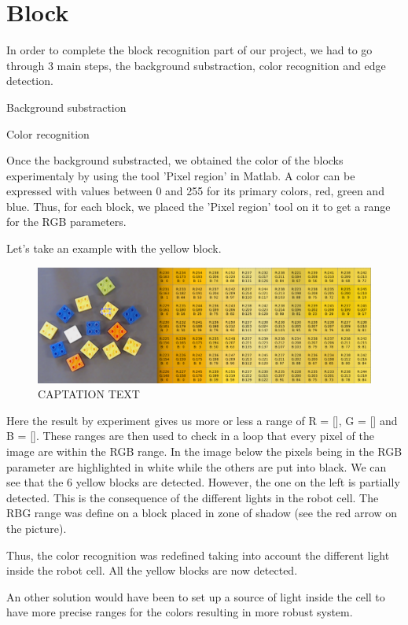 
\chapter{Block}\label{ch:block_recognition}


In order to complete the block recognition part of our project, we had to go through 3 main steps, the background substraction, color recognition and edge detection.

\begin{flushleft}
Background substraction
\end{flushleft}



\begin{flushleft}
Color recognition
\end{flushleft}


 	Once the background substracted, we obtained the color of the blocks experimentaly by using the tool 'Pixel region' in Matlab. A color can be expressed with values between 0 and 255 for its primary colors, red, green and blue. Thus, for each block, we placed the 'Pixel region' tool on it to get a range for the RGB parameters.\par
\begin{flushleft}
Let's take an example with the yellow block.
\end{flushleft} \par

 	\begin{figure}[hb]
  \centering
  \includegraphics[scale=0.3]{figures/Thres_Y_manualy2.png}
  \caption[LABEL] {CAPTATION TEXT}
\end{figure}
Here the result by experiment gives us more or less a range of R = [], G = [] and B = []. These ranges are then used to check in a loop that every pixel of the image are within the RGB range.
In the image below the pixels being in the RGB parameter are highlighted in white while the others are put into black. We can see that the 6 yellow blocks are detected. 
However, the one on the left is partially detected. This is the consequence of the different lights in the robot cell. The RBG range was define on a block placed in zone of shadow (see the red arrow on the picture).
\graphicspath{{figures/Thres_Y_bad2.png}}
Thus, the color recognition was redefined taking into account the different light inside the robot cell. All the yellow blocks are now detected.
\graphicspath{{figures/Thres_Y_good.png}}
An other solution would have been to set up a source of light inside the cell to have more precise ranges for the colors resulting in more robust system.


